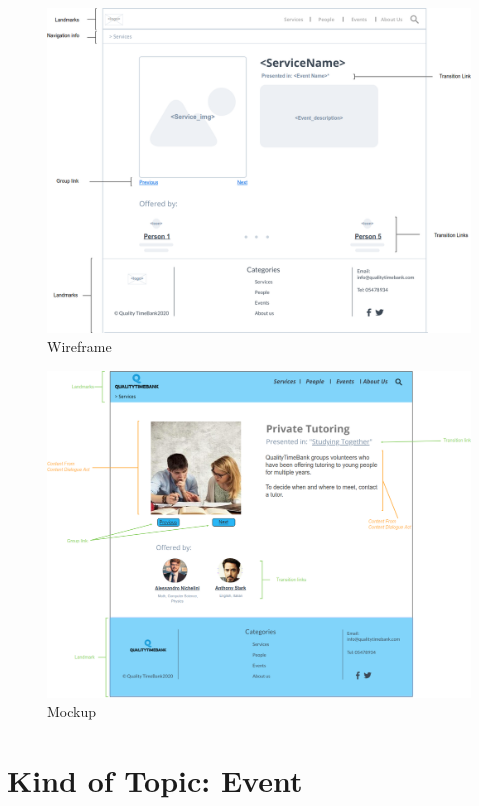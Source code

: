 \documentclass[a4paper, 11pt, parskip=half, headsepline]{scrreprt}
\begin{document}
\begin{figure}[H]
    \centering
    \includegraphics[width=1\linewidth, keepaspectratio]{wireframes/KindOfTopic-Service}
    \caption{Wireframe}
\end{figure}


\begin{figure}[H]
    \centering
    \includegraphics[width=1\linewidth, keepaspectratio]{mockups/ConcreteService}
    \caption{Mockup}
\end{figure}

\section{Kind of Topic: Event}
\end{document}
